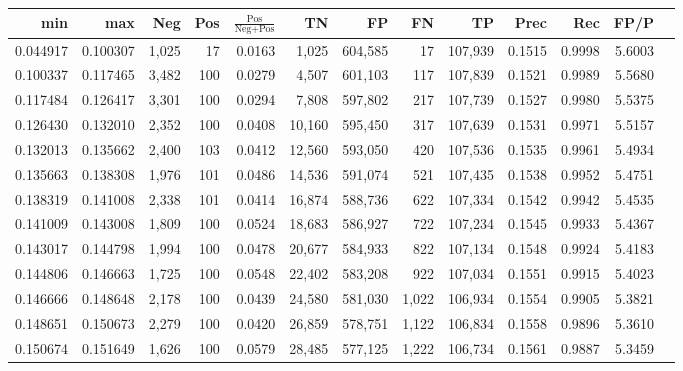 \begin{tabular}{rrrrrrrrrrrrr}
\toprule
     min &      max &   Neg & Pos & $\frac{\text{Pos}}{\text{Neg}+\text{Pos}}$ &      TN &      FP &      FN &      TP &   Prec &    Rec &   FP/P \\
\midrule
0.044917 & 0.100307 & 1,025 &  17 &                                     0.0163 &   1,025 & 604,585 &      17 & 107,939 & 0.1515 & 0.9998 & 5.6003 \\
0.100337 & 0.117465 & 3,482 & 100 &                                     0.0279 &   4,507 & 601,103 &     117 & 107,839 & 0.1521 & 0.9989 & 5.5680 \\
0.117484 & 0.126417 & 3,301 & 100 &                                     0.0294 &   7,808 & 597,802 &     217 & 107,739 & 0.1527 & 0.9980 & 5.5375 \\
0.126430 & 0.132010 & 2,352 & 100 &                                     0.0408 &  10,160 & 595,450 &     317 & 107,639 & 0.1531 & 0.9971 & 5.5157 \\
0.132013 & 0.135662 & 2,400 & 103 &                                     0.0412 &  12,560 & 593,050 &     420 & 107,536 & 0.1535 & 0.9961 & 5.4934 \\
0.135663 & 0.138308 & 1,976 & 101 &                                     0.0486 &  14,536 & 591,074 &     521 & 107,435 & 0.1538 & 0.9952 & 5.4751 \\
0.138319 & 0.141008 & 2,338 & 101 &                                     0.0414 &  16,874 & 588,736 &     622 & 107,334 & 0.1542 & 0.9942 & 5.4535 \\
0.141009 & 0.143008 & 1,809 & 100 &                                     0.0524 &  18,683 & 586,927 &     722 & 107,234 & 0.1545 & 0.9933 & 5.4367 \\
0.143017 & 0.144798 & 1,994 & 100 &                                     0.0478 &  20,677 & 584,933 &     822 & 107,134 & 0.1548 & 0.9924 & 5.4183 \\
0.144806 & 0.146663 & 1,725 & 100 &                                     0.0548 &  22,402 & 583,208 &     922 & 107,034 & 0.1551 & 0.9915 & 5.4023 \\
0.146666 & 0.148648 & 2,178 & 100 &                                     0.0439 &  24,580 & 581,030 &   1,022 & 106,934 & 0.1554 & 0.9905 & 5.3821 \\
0.148651 & 0.150673 & 2,279 & 100 &                                     0.0420 &  26,859 & 578,751 &   1,122 & 106,834 & 0.1558 & 0.9896 & 5.3610 \\
0.150674 & 0.151649 & 1,626 & 100 &                                     0.0579 &  28,485 & 577,125 &   1,222 & 106,734 & 0.1561 & 0.9887 & 5.3459 \\

\end{tabular}
